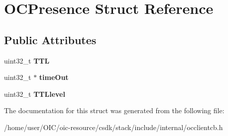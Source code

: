 \hypertarget{structOCPresence}{}\section{O\+C\+Presence Struct Reference}
\label{structOCPresence}
\subsection*{Public Attributes}
\begin{DoxyCompactItemize}
\item 
\hypertarget{structOCPresence_a3f8c16e0f7453e52ed1eb9550667b55c}{}uint32\+\_\+t {\bfseries T\+T\+L}\label{structOCPresence_a3f8c16e0f7453e52ed1eb9550667b55c}

\item 
\hypertarget{structOCPresence_a3046f816f3d06fc5f175f9b87f7d9e62}{}uint32\+\_\+t $\ast$ {\bfseries time\+Out}\label{structOCPresence_a3046f816f3d06fc5f175f9b87f7d9e62}

\item 
\hypertarget{structOCPresence_a0f7b0c2af60732f672d471b680423d79}{}uint32\+\_\+t {\bfseries T\+T\+Llevel}\label{structOCPresence_a0f7b0c2af60732f672d471b680423d79}

\end{DoxyCompactItemize}


The documentation for this struct was generated from the following file\+:\begin{DoxyCompactItemize}
\item 
/home/user/\+O\+I\+C/oic-\/resource/csdk/stack/include/internal/occlientcb.\+h\end{DoxyCompactItemize}
